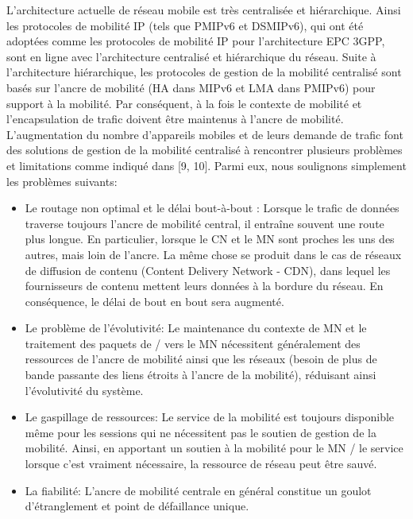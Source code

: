 L'architecture actuelle de réseau mobile est très centralisée et hiérarchique. Ainsi les protocoles de mobilité IP (tels que PMIPv6 et DSMIPv6), qui ont été adoptées comme les protocoles de mobilité IP pour l'architecture EPC 3GPP, sont en ligne avec l'architecture centralisé et hiérarchique du réseau. Suite à l'architecture hiérarchique, les protocoles de gestion de la mobilité centralisé sont basés sur l'ancre de mobilité (HA dans MIPv6 et LMA dans PMIPv6) pour support à la mobilité. Par conséquent, à la fois le contexte de mobilité et l'encapsulation de trafic doivent être maintenus à l'ancre de mobilité. L'augmentation du nombre d'appareils mobiles et de leurs demande de trafic font des solutions de gestion de la mobilité centralisé à rencontrer plusieurs problèmes et limitations comme indiqué dans [9, 10]. Parmi eux, nous soulignons simplement les problèmes suivants:
\begin{itemize}
\item Le routage non optimal et le délai bout-à-bout : Lorsque le trafic de données traverse toujours l'ancre de mobilité central, il entraîne souvent une route plus longue. En particulier, lorsque le CN et le MN sont proches les uns des autres, mais loin de l'ancre. La même chose se produit dans le cas de réseaux de diffusion de contenu (Content Delivery Network - CDN), dans lequel les fournisseurs de contenu mettent leurs données à la bordure du réseau. En conséquence, le délai de bout en bout sera augmenté.
\item Le problème de l'évolutivité: Le maintenance du contexte de MN et le traitement des paquets de / vers le MN nécessitent généralement des ressources de l'ancre de mobilité ainsi que les réseaux (besoin de plus de bande passante des liens étroits à l'ancre de la mobilité), réduisant ainsi l'évolutivité du système.
\item Le gaspillage de ressources: Le service de la mobilité est toujours disponible même pour les sessions qui ne nécessitent pas le soutien de gestion de la mobilité. Ainsi, en apportant un soutien à la mobilité pour le MN / le service lorsque c'est vraiment nécessaire, la ressource de réseau peut être sauvé.
\item La fiabilité: L'ancre de mobilité centrale en général constitue un goulot d'étranglement et point de défaillance unique.
\end{itemize}

